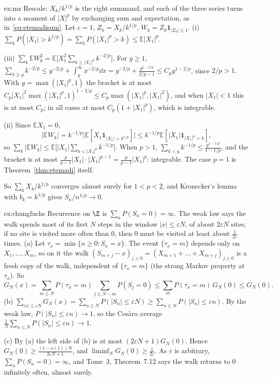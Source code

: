 \begin{solution}{ex:mz}
\idea Rescale: $X_k/k^{1/p}$ is the right summand, and each of the three series turns into a moment of $|X|^p$ by exchanging sum and expectation, as
in~\eqref{eq:etemadisum}.
\writeup Let $c=1$, $Z_k=X_k/k^{1/p}$, $W_k=Z_k\mathbf 1_{|Z_k|\le1}$. (i) $\sum_kP(|X_1|>k^{1/p})=\sum_kP(|X_1|^p>k)\le\mathbb E|X_1|^p$.

(iii) $\sum_k\mathbb E W_k^2=\mathbb E\bigl[X_1^2\sum_{k\ge|X_1|^p}k^{-2/p}\bigr]$. For $y\ge1$, $\sum_{k\ge y}k^{-2/p}\le y^{-2/p}+\int_y^\infty x^{-2/p}\dd x=
y^{-2/p}+\frac{y^{1-2/p}}{2/p-1}\le C_py^{1-2/p}$, since $2/p>1$. With $y=\max(|X_1|^p,1)$ the bracket is at most $C_p|X_1|^2\max(|X_1|^p,1)^{1-2/p}\le C_p\max(|X_1|^p,|X_1|^2)$,
and when $|X_1|<1$ this is at most $C_p$; in all cases at most $C_p(1+|X_1|^p)$, which is integrable.

(ii) Since $\mathbb E X_1=0$,
\[
|\mathbb E W_k|=k^{-1/p}\bigl|\mathbb E[X_1\mathbf 1_{|X_1|>k^{1/p}}]\bigr|\le k^{-1/p}\mathbb E[|X_1|\mathbf 1_{|X_1|^p>k}],
\]
so $\sum_k|\mathbb E W_k|\le\mathbb E\bigl[|X_1|\sum_{k<|X_1|^p}k^{-1/p}\bigr]$. When $p>1$, $\sum_{k<y}k^{-1/p}\le\frac{y^{1-1/p}}{1-1/p}$, and the bracket is at most
$\frac p{p-1}|X_1|\cdot|X_1|^{p-1}=\frac p{p-1}|X_1|^p$: integrable. The case $p=1$ is Theorem~\ref{thm:etemadi} itself.

So $\sum_kX_k/k^{1/p}$ converges almost surely for $1<p<2$, and Kronecker's lemma with $b_k=k^{1/p}$ gives $S_n/n^{1/p}\to0$.
\end{solution}

\begin{solution}{ex:chungfuchs}
\idea Recurrence on $\Z$ is $\sum_nP(S_n=0)=\infty$. The weak law says the walk spends most of its first $N$ steps in the window $|x|\le\varepsilon N$, of
about $2\varepsilon N$ sites; if no site is visited more often than $0$, then $0$ must be visited at least about $\frac1{2\varepsilon}$ times.
\writeup (a) Let $\tau_x=\min\{n\ge0:S_n=x\}$. The event $\{\tau_x=m\}$ depends only on $X_1,\dots,X_m$, so on it the walk $(S_{m+j}-x)_{j\ge0}=(X_{m+1}+\dots+X_{m+j})_{j\ge0}$ is a
fresh copy of the walk, independent of $\{\tau_x=m\}$ (the strong Markov property at $\tau_x$). So
\[
G_N(x)=\sum_{m\le N}P(\tau_x=m)\sum_{j\le N-m}P(S_j=0)\le\sum_mP(\tau_x=m)\,G_N(0)\le G_N(0).
\]
(b) $\sum_{|x|\le\varepsilon N}G_N(x)=\sum_{n\le N}P(|S_n|\le\varepsilon N)\ge\sum_{n\le N}P(|S_n|\le\varepsilon n)$. By the weak law, $P(|S_n|\le\varepsilon n)\to1$,
so the Ces\`aro average $\frac1N\sum_{n\le N}P(|S_n|\le\varepsilon n)\to1$.

(c) By (a) the left side of (b) is at most $(2\varepsilon N+1)G_N(0)$. Hence $G_N(0)\ge\frac{(1-o(1))N}{2\varepsilon N+1}$, and $\liminf_NG_N(0)\ge\frac1{2\varepsilon}$.
As $\varepsilon$ is arbitrary, $\sum_nP(S_n=0)=\infty$, and Tome~3, Theorem~7.12 says the walk returns to $0$ infinitely often, almost surely.
\end{solution}

